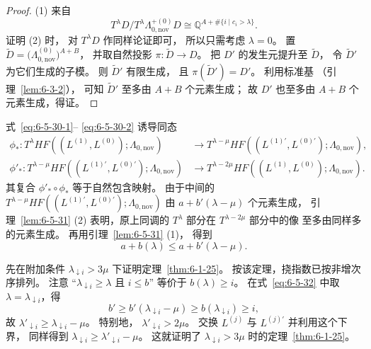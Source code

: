 \begin{proof}
\textup{(1)} 来自
\[
T^\lambda D
\big/
T^\lambda\Lambda_{0,\mathrm{nov}}^{+(0)}D
\cong
\mathbb Q^{A+\#\{i\mid c_i>\lambda\}}.
\]
证明 \textup{(2)} 时，
对 $T^\lambda D$ 作同样论证即可，
所以只需考虑 $\lambda=0$。
置
$\widetilde D
=\bigl(\Lambda_{0,\mathrm{nov}}^{(0)}\bigr)^{A+B}$，
并取自然投影
$\pi:\widetilde D\to D$。
把 $D'$ 的发生元提升至
$\widetilde D$，
令 $\widetilde D'$ 为它们生成的子模。
则 $\widetilde D'$ 有限生成，
且 $\pi(\widetilde D')=D'$。
利用标准基
（引理~\ref{lem:6-3-2}），
可知 $\widetilde D'$ 至多由
$A+B$ 个元素生成；
故 $D'$ 也至多由
$A+B$ 个元素生成，得证。
\end{proof}

式~\eqref{eq:6-5-30-1}--
\eqref{eq:6-5-30-2} 诱导同态
\[
\begin{aligned}
\phi_*:
T^\lambda HF((L^{(1)},L^{(0)});
\Lambda_{0,\mathrm{nov}})
&\longrightarrow
T^{\lambda-\mu}
HF((L^{(1)\prime},L^{(0)\prime});
\Lambda_{0,\mathrm{nov}}),\\
\phi'_*:
T^{\lambda-\mu}
HF((L^{(1)\prime},L^{(0)\prime});
\Lambda_{0,\mathrm{nov}})
&\longrightarrow
T^{\lambda-2\mu}
HF((L^{(1)},L^{(0)});
\Lambda_{0,\mathrm{nov}}).
\end{aligned}
\]
其复合 $\phi'_*\circ\phi_*$
等于自然包含映射。
由于中间的
$T^{\lambda-\mu}
HF((L^{(1)\prime},L^{(0)\prime});
\Lambda_{0,\mathrm{nov}})$
由 $a+b'(\lambda-\mu)$ 个元素生成，
引理~\ref{lem:6-5-31} \textup{(2)}
表明，原上同调的
$T^\lambda$ 部分在
$T^{\lambda-2\mu}$ 部分中的像
至多由同样多的元素生成。
再用引理~\ref{lem:6-5-31} \textup{(1)}，
得到
\begin{equation}
a+b(\lambda)
\le a+b'(\lambda-\mu).
\tag{6.5.32}\label{eq:6-5-32}
\end{equation}

先在附加条件
$\lambda_{\downarrow i}>3\mu$
下证明定理~\ref{thm:6-1-25}。
按该定理，挠指数已按非增次序排列。
注意
“$\lambda_{\downarrow i}\ge\lambda$
且 $i\le b$”
等价于 $b(\lambda)\ge i$。
在式~\eqref{eq:6-5-32} 中取
$\lambda=\lambda_{\downarrow i}$，得
\[
b'\ge
b'(\lambda_{\downarrow i}-\mu)
\ge b(\lambda_{\downarrow i})
\ge i,
\]
故
$\lambda'_{\downarrow i}
\ge\lambda_{\downarrow i}-\mu$。
特别地，
$\lambda'_{\downarrow i}>2\mu$。
交换 $L^{(j)}$ 与 $L^{(j)\prime}$
并利用这个下界，
同样得到
$\lambda_{\downarrow i}
\ge\lambda'_{\downarrow i}-\mu$。
这就证明了
$\lambda_{\downarrow i}>3\mu$
时的定理~\ref{thm:6-1-25}。

